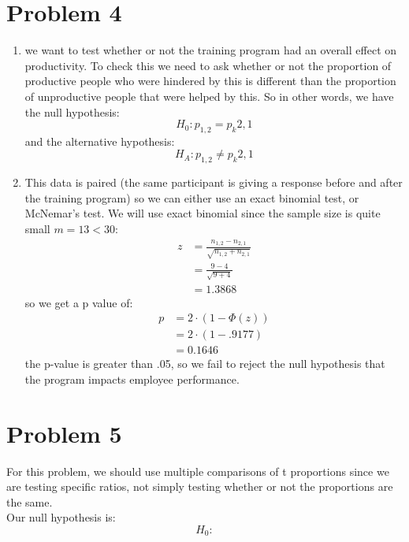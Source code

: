 \documentclass{article}
\begin{document}
\section*{Problem 4}
\begin{enumerate}
\item we want to test whether or not the training program had an overall effect on productivity. To check this we need to ask whether or not the proportion of productive people who were hindered by this is different than the proportion of unproductive people that were helped by this. So in other words, we have the null hypothesis: \\
\[
H_0: p_{1,2} = p_k{2,1}
\]
and the alternative hypothesis: \\
\[
H_A: p_{1,2} \neq p_k{2,1}
\]
\item This data is paired (the same participant is giving a response before and after the training program) so we can either use an exact binomial test, or McNemar's test. We will use exact binomial since the sample size is quite small $m = 13 < 30$: \\
\begin{align*}
z &= \frac{n_{1,2} - n_{2,1}}{\sqrt{n_{1,2} + n_{2,1}}} \\
&= \frac{9 - 4}{\sqrt{9 + 4}} \\
&= 1.3868
\end{align*}
so we get a p value of: \\
\begin{align*}
p &= 2 \cdot (1 - \Phi(z)) \\
&= 2 \cdot (1 - .9177) \\
&= 0.1646
\end{align*}
the p-value is greater than .05, so we fail to reject the null hypothesis that the program impacts employee performance.
\end{enumerate}
\section*{Problem 5}
For this problem, we should use multiple comparisons of t proportions since we are testing specific ratios, not simply testing whether or not the proportions are the same. \\
Our null hypothesis is: \\
\[
H_0: 
\]
\end{document}
